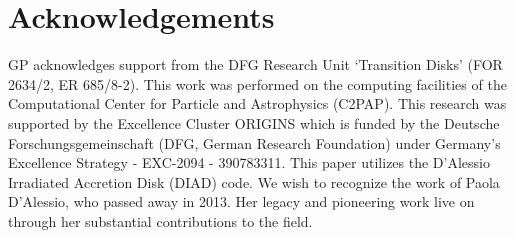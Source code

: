 \documentclass[usenatbib,useAMS,usedcolumn]{mnras}
\begin{document}
\section*{Acknowledgements}

    GP acknowledges support from the DFG Research Unit ‘Transition Disks’ (FOR 2634/2, ER 685/8-2).
    This work was performed on the computing facilities of the Computational Center for Particle and Astrophysics (C2PAP).
    This research was supported by the Excellence Cluster ORIGINS which is funded by the Deutsche Forschungsgemeinschaft (DFG, German Research Foundation) under Germany's Excellence Strategy - EXC-2094 - 390783311.
    This paper utilizes the D’Alessio Irradiated Accretion Disk (DIAD) code. We wish to recognize the work of Paola D’Alessio, who passed away in 2013. Her legacy and pioneering work live on through her substantial contributions to the field.




\bsp	%
\label{lastpage}
\end{document}
